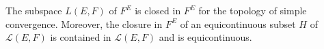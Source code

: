 The subspace \(L(E, F)\) of \(F^E\) is closed in \(F^E\) for the topology of simple convergence. Moreover, the closure in \(F^E\) of an equicontinuous subset \(H\) of \(\mathcal{L}(E, F)\) is contained in \(\mathcal{L}(E, F)\) and is equicontinuous.